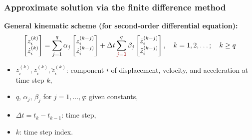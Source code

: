 \documentclass[aspectratio=169]{beamer}
\begin{document}
\begin{frame}
  \frametitle{Approximate solution via the finite difference method}
  \begin{block}{}
    \textbf{General kinematic scheme (for second-order differential equation):}
    \[
      \begin{bmatrix}
        z_i^{(k)} \\
        \dot{z}_i^{(k)}
      \end{bmatrix}
      =
      \sum_{j=1}^{q} \alpha_j
      \begin{bmatrix}
        z_i^{(k-j)} \\
        \dot{z}_i^{(k-j)}
      \end{bmatrix}
      +
      \Delta t \sum_{{\color{darkred}j=0}}^{q} \beta_j
      \begin{bmatrix}
        \dot{z}_i^{(k-j)} \\
        \ddot{z}_i^{(k-j)}
      \end{bmatrix},
      \quad k = 1, 2, \dots; \quad k \geq q
    \]

    \vspace{1em}

    \begin{itemize}
      \item $z_i^{(k)}, \dot{z}_i^{(k)}, \ddot{z}_i^{(k)}$: component $i$ of displacement, velocity, and acceleration at time step $k$,
      \item $q$, $\alpha_j$, $\beta_j$ for $j=1,\dots,q$: given constants,
      \item $\Delta t = t_k - t_{k-1}$: time step,
      \item $k$: time step index.
    \end{itemize}
  \end{block}
\end{frame}
\end{document}
